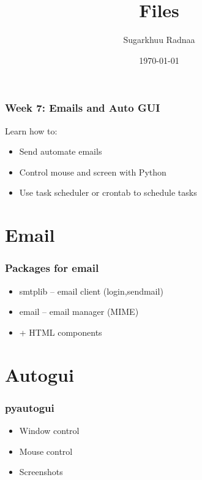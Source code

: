 \documentclass{beamer}
\title[Introduction to Python]{Files}
\author{Sugarkhuu Radnaa}
\institute[]
{
Py4Econ in Ulaanbaatar \\ 
\medskip
\textit{py4econ@gmail.com} 
}
\date{\today}  %
\begin{document}
\begin{frame}
\titlepage %
\end{frame}

\begin{frame}
    \frametitle{Week 7: Emails and Auto GUI}
    Learn how to:
    \begin{itemize}
        \item Send automate emails
        \item Control mouse and screen with Python
        \item Use task scheduler or crontab to schedule tasks
    \end{itemize}
\end{frame}

\section{Email} 

\begin{frame}
    \frametitle{Packages for email}
            \begin{itemize}
                \item smtplib – email client (login,sendmail)
                \item email – email manager (MIME)
                \item + HTML components
            \end{itemize}
\end{frame}

\section{Autogui} 

\begin{frame}
    \frametitle{pyautogui}
            \begin{itemize}
                \item Window control
                \item Mouse control
                \item Screenshots
            \end{itemize}
\end{frame}

\end{document}
